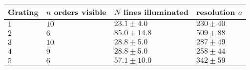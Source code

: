 	\begin{tabular}{|p{2cm}|p{3.82cm}|p{3.82cm}|p{3.82cm}|}
		\hline
		\rowcolor{tabcolor}
		Grating & $n$ orders visible & $N$ lines illuminated & resolution $a$ \\ \hline
		$1$  & $10$ & $23.1 \pm 4.0$ & $ 230 \pm 40 $ \\
		$2$  & $6$ & $85.0 \pm 14.8$ & $ 509 \pm 88 $ \\
		$3$  & $10$ & $28.8 \pm 5.0$ & $ 287 \pm 49 $ \\
		$4$  & $9$ & $28.8 \pm 5.0$ & $ 258 \pm 44 $ \\
		$5$  & $6$ & $57.1 \pm 10.0$ & $ 342 \pm 59 $ \\
		\hline
	\end{tabular}
